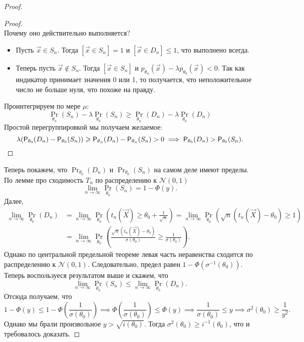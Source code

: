\begin{proof}
\begin{proof}
\[        \]
        Почему оно действительно выполняется?
        \begin{itemize}
            \item Пусть $\vec{x} \in S_{n}$. Тогда $[\vec{x} \in S_{n}] = 1$ и $[\vec{x} \in D_{n}] \leq 1$, что выполнено всегда.
            \item Теперь пусть $\vec{x} \not\in S_{n}$. Тогда $[\vec{x} \in S_{n}]$ и $p_{\theta_{n}}(\vec{x}) - \lambda p_{\theta_{0}}(\vec{x}) < 0$. Так как индикатор принимает значения 0 или 1, то получается, что неположительное число не больше нуля, что похоже на правду. 
        \end{itemize}
        Проинтегрируем по мере $\mu$:
        \[
            \Pr_{\theta_{n}}(S_{n}) - \lambda\Pr_{\theta_{0}}(S_{n}) \geq \Pr_{\theta_{n}}(D_{n}) - \lambda\Pr_{\theta_{0}}(D_{n})
        \]
        Простой перегруппировкой мы получаем желаемое:
        \[
            \lambda(\Pr_{\theta_{0}}(D_{n}) - \Pr_{\theta_{0}}(S_{n})) \geq \Pr_{\theta_{n}}(D_{n}) - \Pr_{\theta_{n}}(S_{n}) > 0 \implies \Pr_{\theta_{0}}(D_{n}) > \Pr_{\theta_{0}}(S_{n}). \qedhere
        \]
    \end{proof}
    Теперь покажем, что $\Pr_{\theta_{0}}(D_{n})$ и $\Pr_{\theta_{0}}(S_{n})$ на самом деле имеют пределы. По лемме про сходимость $T_{n}$ по распределению к $\mathcal{N}(0, 1)$
    \[
        \lim\limits_{n \to \infty} \Pr_{\theta_{0}}(S_{n}) = 1 - \Phi(y).
    \]
    Далее,
    \begin{align*}
        \lim\limits_{n \to \infty} \Pr_{\theta_{0}}(D_{n})
        &= \lim\limits_{n \to \infty} \Pr_{\theta_{0}}\left(t_{n}(\vec{X}) \geq \theta_{0} + \frac{1}{\sqrt{n}}\right)
        = \lim\limits_{n \to \infty} \Pr_{\theta_{0}}\left(\sqrt{n}(t_{n}(\vec{X}) - \theta_{0}) \geq 1\right) \\
        &= \lim\limits_{n \to \infty} \Pr_{\theta_{0}}\left(\frac{\sqrt{n}(t_{n}(\vec{X}) - \theta_{0})}{\sigma(\theta_{0})} \geq \frac{1}{\sigma(\theta_{0})}\right).
    \end{align*}
    Однако по центральной предельной теореме левая часть неравенства сходится по распределению к $\mathcal{N}(0, 1)$. Следовательно, предел равен $1 - \Phi(\sigma^{-1}(\theta_{0}))$. Теперь воспользуеся результатом выше и скажем, что
    \[
        \lim\limits_{n \to \infty} \Pr_{\theta_{0}}(S_{n}) \leq \lim\limits_{n \to \infty} \Pr_{\theta_{0}}(D_{n}).
    \]
    Отсюда получаем, что
    \[
        1 - \Phi(y) \leq 1 - \Phi\left(\frac{1}{\sigma(\theta_{0})}\right) 
        \implies 
        \Phi\left(\frac{1}{\sigma(\theta_{0})}\right) \leq \Phi(y)
        \implies
        \frac{1}{\sigma(\theta_{0})} \leq y
        \implies
        \sigma^{2}(\theta_{0}) \geq \frac{1}{y^{2}}.
    \]
    Однако мы брали произвольное $y > \sqrt{i(\theta_{0})}$. Тогда $\sigma^{2}(\theta_{0}) \geq i^{-1}(\theta_{0})$, что и требовалось доказать.
\end{proof}

